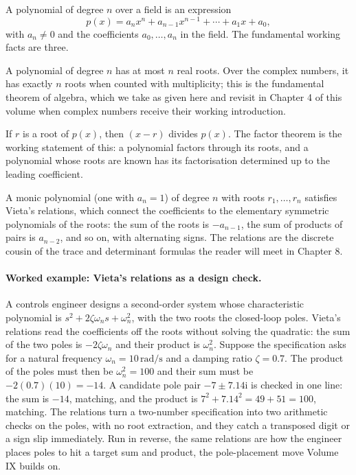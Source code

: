 A polynomial of degree $n$ over a field is an expression
\[
p(x) = a_{n}x^{n} + a_{n-1}x^{n-1} + \cdots + a_{1}x + a_{0},
\]
with $a_{n} \neq 0$ and the coefficients $a_{0}, \ldots, a_{n}$ in the
field. The fundamental working facts are three.

A polynomial of degree $n$ has at most $n$ real roots. Over the
complex numbers, it has exactly $n$ roots when counted with
multiplicity; this is the fundamental theorem of algebra, which we
take as given here and revisit in Chapter 4 of this volume when
complex numbers receive their working introduction.

If $r$ is a root of $p(x)$, then $(x - r)$ divides $p(x)$. The factor
theorem is the working statement of this: a polynomial factors
through its roots, and a polynomial whose roots are known has its
factorisation determined up to the leading coefficient.

A monic polynomial (one with $a_{n} = 1$) of degree $n$ with roots
$r_{1}, \ldots, r_{n}$ satisfies Vieta's relations, which connect the
coefficients to the elementary symmetric polynomials of the roots:
the sum of the roots is $-a_{n-1}$, the sum of products of pairs is
$a_{n-2}$, and so on, with alternating signs. The relations are the
discrete cousin of the trace and determinant formulas the reader will
meet in Chapter 8.

\paragraph{Worked example: Vieta's relations as a design check.} A
controls engineer designs a second-order system whose characteristic
polynomial is $s^{2} + 2\zeta\omega_{n} s + \omega_{n}^{2}$, with the two
roots the closed-loop poles. Vieta's relations read the coefficients off
the roots without solving the quadratic: the sum of the two poles is
$-2\zeta\omega_{n}$ and their product is $\omega_{n}^{2}$. Suppose the
specification asks for a natural frequency $\omega_{n} =
10\,\text{rad/s}$ and a damping ratio $\zeta = 0.7$. The product of the
poles must then be $\omega_{n}^{2} = 100$ and their sum must be
$-2(0.7)(10) = -14$. A candidate pole pair $-7 \pm 7.14\mathrm{i}$ is
checked in one line: the sum is $-14$, matching, and the product is
$7^{2} + 7.14^{2} = 49 + 51 = 100$, matching. The relations turn a
two-number specification into two arithmetic checks on the poles, with
no root extraction, and they catch a transposed digit or a sign slip
immediately. Run in reverse, the same relations are how the engineer
places poles to hit a target sum and product, the pole-placement move
Volume IX builds on.

